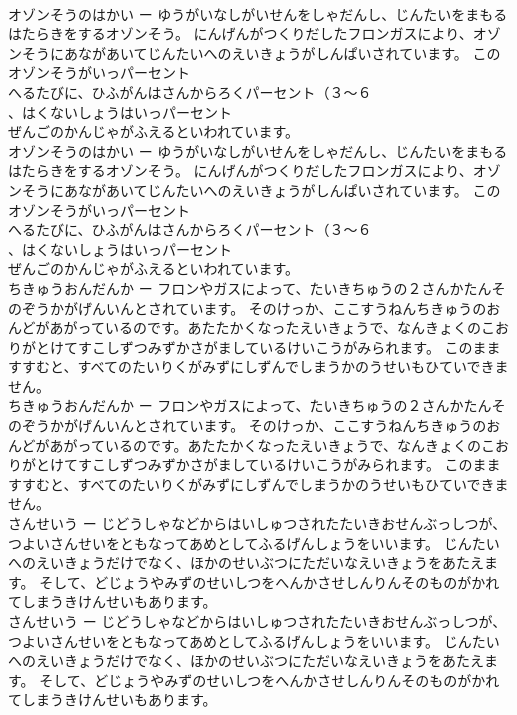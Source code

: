 \documentclass[8pt]{extreport}
\begin{document}
\begin{CJK}{UTF8}{min}
\\	オゾンそうのはかい ー ゆうがいなしがいせんをしゃだんし、じんたいをまもるはたらきをするオゾンそう。 にんげんがつくりだしたフロンガスにより、オゾンそうにあながあいてじんたいへのえいきょうがしんぱいされています。 このオゾンそうがいっパーセント
\\	へるたびに、ひふがんはさんからろくパーセント（３〜６
\\	、はくないしょうはいっパーセント
\\	ぜんごのかんじゃがふえるといわれています。
\\	オゾンそうのはかい ー ゆうがいなしがいせんをしゃだんし、じんたいをまもるはたらきをするオゾンそう。 にんげんがつくりだしたフロンガスにより、オゾンそうにあながあいてじんたいへのえいきょうがしんぱいされています。 このオゾンそうがいっパーセント
\\	へるたびに、ひふがんはさんからろくパーセント（３〜６
\\	、はくないしょうはいっパーセント
\\	ぜんごのかんじゃがふえるといわれています。
\\	ちきゅうおんだんか ー フロンやガスによって、たいきちゅうの２さんかたんそのぞうかがげんいんとされています。 そのけっか、ここすうねんちきゅうのおんどがあがっているのです。あたたかくなったえいきょうで、なんきょくのこおりがとけてすこしずつみずかさがましているけいこうがみられます。 このまますすむと、すべてのたいりくがみずにしずんでしまうかのうせいもひていできません。
\\	ちきゅうおんだんか ー フロンやガスによって、たいきちゅうの２さんかたんそのぞうかがげんいんとされています。 そのけっか、ここすうねんちきゅうのおんどがあがっているのです。あたたかくなったえいきょうで、なんきょくのこおりがとけてすこしずつみずかさがましているけいこうがみられます。 このまますすむと、すべてのたいりくがみずにしずんでしまうかのうせいもひていできません。
\\	さんせいう ー じどうしゃなどからはいしゅつされたたいきおせんぶっしつが、つよいさんせいをともなってあめとしてふるげんしょうをいいます。 じんたいへのえいきょうだけでなく、ほかのせいぶつにただいなえいきょうをあたえます。 そして、どじょうやみずのせいしつをへんかさせしんりんそのものがかれてしまうきけんせいもあります。
\\	さんせいう ー じどうしゃなどからはいしゅつされたたいきおせんぶっしつが、つよいさんせいをともなってあめとしてふるげんしょうをいいます。 じんたいへのえいきょうだけでなく、ほかのせいぶつにただいなえいきょうをあたえます。 そして、どじょうやみずのせいしつをへんかさせしんりんそのものがかれてしまうきけんせいもあります。

\end{CJK}
\end{document}

